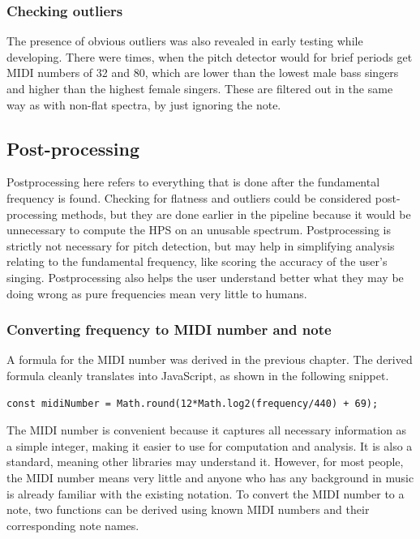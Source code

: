 \subsubsection{Checking outliers}
The presence of obvious outliers was also revealed in early testing while developing. There were times, when the pitch detector would for brief periods get MIDI numbers of 32 and 80, which are lower than the lowest male bass singers and higher than the highest female singers. These are filtered out in the same way as with non-flat spectra, by just ignoring the note. 

\subsection{Post-processing}
Postprocessing here refers to everything that is done after the fundamental frequency is found. Checking for flatness and outliers could be considered post-processing methods, but they are done earlier in the pipeline because it would be unnecessary to compute the HPS on an unusable spectrum. Postprocessing is strictly not necessary for pitch detection, but may help in simplifying analysis relating to the fundamental frequency, like scoring the accuracy of the user's singing. Postprocessing also helps the user understand better what they may be doing wrong as pure frequencies mean very little to humans. 

\subsubsection{Converting frequency to MIDI number and note}
A formula for the MIDI number was derived in the previous chapter. The derived formula cleanly translates into JavaScript, as shown in the following snippet.

\begin{lstlisting}[style=javascript]
    const midiNumber = Math.round(12*Math.log2(frequency/440) + 69);
\end{lstlisting}

The MIDI number is convenient because it captures all necessary information as a simple integer, making it easier to use for computation and analysis. It is also a standard, meaning other libraries may understand it. However, for most people, the MIDI number means very little and anyone who has any background in music is already familiar with the existing notation. To convert the MIDI number to a note, two functions can be derived using known MIDI numbers and their corresponding note names. 


